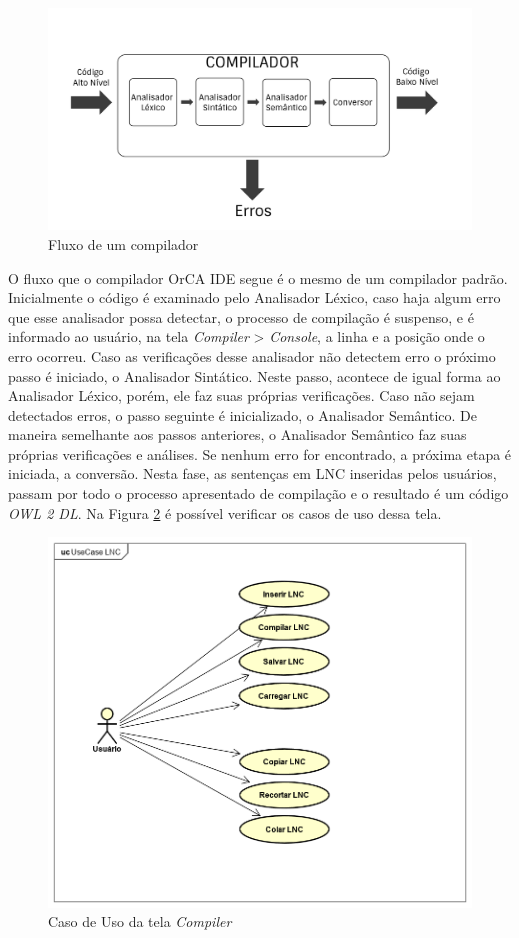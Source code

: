 \documentclass{bcc}
\begin{document}
\begin{figure}[H]
\centering
\includegraphics[width=.8\textwidth]{Figuras/compiladorscheme.png}
\caption{Fluxo de um compilador}
\label{fig:compilerscheme}
\end{figure}

O fluxo que o compilador OrCA IDE segue é o mesmo de um compilador padrão. Inicialmente o código é examinado pelo Analisador Léxico, caso haja algum erro que esse analisador possa detectar, o processo de compilação é suspenso, e é informado ao usuário, na tela \textit{Compiler} > \textit{Console}, a linha e a posição onde o erro ocorreu. Caso as verificações desse analisador não detectem erro o próximo passo é iniciado, o Analisador Sintático. Neste passo, acontece de igual forma ao Analisador Léxico, porém, ele faz suas próprias verificações. Caso não sejam detectados erros, o passo seguinte é inicializado, o Analisador Semântico. De maneira semelhante aos passos anteriores, o Analisador Semântico faz suas próprias verificações e análises. Se nenhum erro for encontrado, a próxima etapa é iniciada, a conversão. Nesta fase, as sentenças em LNC inseridas pelos usuários, passam por todo o processo apresentado de compilação e o resultado é um código \textit{OWL 2 DL}. Na Figura \ref{fig:uclnc} é possível verificar os casos de uso dessa tela.

\begin{figure}[H]
\centering
\includegraphics[width=.6\textwidth]{Figuras/UseCaseLNC.png}
\caption{Caso de Uso da tela \textit{Compiler}} 
\label{fig:uclnc}
\end{figure}
\end{document}
